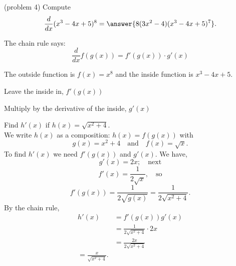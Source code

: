 \documentclass{ximera}
\begin{document}
\begin{center}
\begin{foldable}
\end{foldable}
\end{center}




\begin{problem}(problem 4)
  Compute
  \[
  \frac{d}{dx} (x^3 - 4x + 5)^8 = \answer{8(3x^2 - 4)(x^3 - 4x + 5)^7 }.
  \]
  
    \begin{hint}
      The chain rule says:
      \[
      \frac{d}{dx} f(g(x)) = f'(g(x))\cdot g'(x)
      \]
    \end{hint}
    \begin{hint}
      The outside function is $f(x) = x^8$ and the inside
      function is $x^3 - 4x + 5$.
    \end{hint}
    \begin{hint}
		  Leave the inside in, $f'(g(x))$
		\end{hint}
		\begin{hint}
		  Multiply by the derivative of the inside, $g'(x)$
		\end{hint}
    
\end{problem}




\begin{example}[example 5]

Find $h'(x)$ if $h(x) = \sqrt{x^2 + 4}$.\\
We write $h(x)$ as a composition: $h(x)=f(g(x))$ with 
\[
g(x) = x^2 + 4  \quad \text{and} \quad  f(x) = \sqrt x.
\] 
To find $h'(x)$ we need $f'(g(x))$ and $g'(x)$.  We have,
\[
g'(x) = 2x; \quad \text{next} 
\]
\[
f'(x) = \frac{1}{2\sqrt x} , \quad \text{so}
\] 
\[
f'(g(x)) = \frac{1}{2\sqrt {g(x)}}=\frac{1}{2\sqrt {x^2 + 4}}.
\]
By the chain rule,
\begin{align*}
h'(x) &= f'(g(x))g'(x)\\
&= \frac{1}{2\sqrt {x^2 + 4}}\cdot 2x\\
&= \frac{2x}{2\sqrt {x^2 + 4}}\\
=\frac{x}{\sqrt {x^2 + 4}}.
\end{align*}
\end{example}

\begin{center}
\begin{foldable}
\end{foldable}
\end{center}
\end{document}
